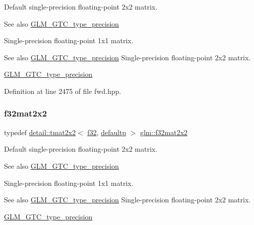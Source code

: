 Default single-\/precision floating-\/point 2x2 matrix. \begin{DoxySeeAlso}{See also}
\hyperlink{group__gtc__type__precision}{G\+L\+M\+\_\+\+G\+T\+C\+\_\+type\+\_\+precision}
\end{DoxySeeAlso}
Single-\/precision floating-\/point 1x1 matrix. \begin{DoxySeeAlso}{See also}
\hyperlink{group__gtc__type__precision}{G\+L\+M\+\_\+\+G\+T\+C\+\_\+type\+\_\+precision} Single-\/precision floating-\/point 2x2 matrix. 

\hyperlink{group__gtc__type__precision}{G\+L\+M\+\_\+\+G\+T\+C\+\_\+type\+\_\+precision} 
\end{DoxySeeAlso}


Definition at line 2475 of file fwd.\+hpp.

\mbox{\label{group__gtc__type__precision_ga4eb16d89ecff72fa77f10c9a1e7ca475}} 
\subsubsection{\texorpdfstring{f32mat2x2}{f32mat2x2}}
{\footnotesize\ttfamily typedef \hyperlink{structglm_1_1detail_1_1tmat2x2}{detail\+::tmat2x2}$<$ \hyperlink{group__gtc__type__precision_ga0ec999b57f5330d9021256e96038df04}{f32}, \hyperlink{namespaceglm_a0f04f086094c747d227af4425893f545a9d21ccd8b5a009ec7eb7677befc3bf51}{defaultp} $>$ \hyperlink{group__gtc__type__precision_ga4eb16d89ecff72fa77f10c9a1e7ca475}{glm\+::f32mat2x2}}

Default single-\/precision floating-\/point 2x2 matrix. \begin{DoxySeeAlso}{See also}
\hyperlink{group__gtc__type__precision}{G\+L\+M\+\_\+\+G\+T\+C\+\_\+type\+\_\+precision}
\end{DoxySeeAlso}
Single-\/precision floating-\/point 1x1 matrix. \begin{DoxySeeAlso}{See also}
\hyperlink{group__gtc__type__precision}{G\+L\+M\+\_\+\+G\+T\+C\+\_\+type\+\_\+precision} Single-\/precision floating-\/point 2x2 matrix. 

\hyperlink{group__gtc__type__precision}{G\+L\+M\+\_\+\+G\+T\+C\+\_\+type\+\_\+precision} 
\end{DoxySeeAlso}


